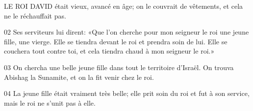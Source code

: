 LE ROI DAVID était vieux, avancé en âge; on le couvrait de vêtements, et cela ne le réchauffait pas.

02 Ses serviteurs lui dirent: «Que l’on cherche pour mon seigneur le roi une jeune fille, une vierge. Elle se tiendra devant le roi et prendra soin de lui. Elle se couchera tout contre toi, et cela tiendra chaud à mon seigneur le roi.»

03 On chercha une belle jeune fille dans tout le territoire d’Israël. On trouva Abishag la Sunamite, et on la fit venir chez le roi.

04 La jeune fille était vraiment très belle; elle prit soin du roi et fut à son service, mais le roi ne s’unit pas à elle.
